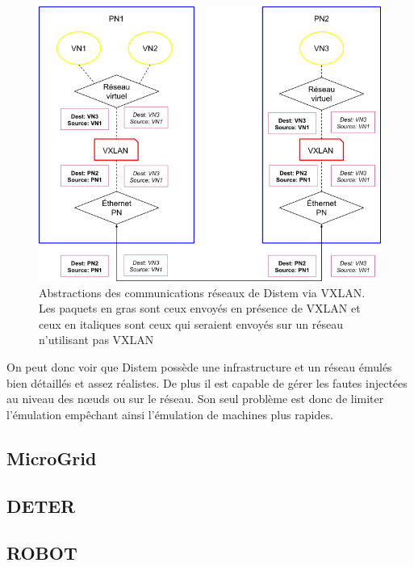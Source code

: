 \begin{figure}%
  \centering
  \includegraphics[scale=0.5]{Pictures/png/Distem_VXLAN}
  \caption{Abstractions des communications réseaux de Distem via VXLAN. Les paquets en gras sont ceux envoyés en présence de VXLAN et ceux en italiques sont ceux qui seraient envoyés sur un réseau n'utilisant pas VXLAN}
  \label{Distem_VXLAN}
\end{figure}

On peut donc voir que Distem possède une infrastructure et un réseau émulés bien détaillés et assez réalistes. De plus il est capable de gérer les fautes injectées au niveau des n\oe uds ou sur le réseau. Son seul problème est donc de limiter l'émulation empêchant ainsi l'émulation de machines plus rapides. 

\subsection{MicroGrid}
\subsection{DETER}
\subsection{ROBOT}
